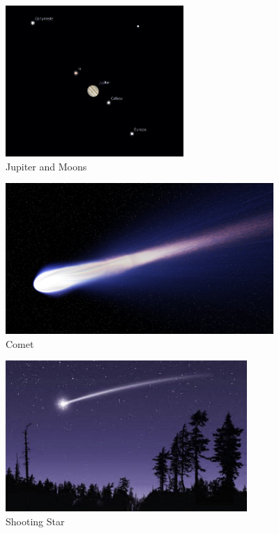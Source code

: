 \documentclass[letterpaper,twoside,12pt]{article}
\begin{document}
\begin{figure}[hbpt]\begin{centering}%
\includegraphics[height=2.25in]{Jupiter-and-moons-58b82f8c3df78c060e64eb8b.jpg}
\caption{Jupiter and Moons}
\label{fig:jupiterandmoons}
\end{centering}\end{figure}
\clearpage
\begin{figure}[hbpt]\begin{centering}%
\includegraphics[height=2.25in]{comet.jpg}
\caption{Comet}
\label{fig:comet}
\end{centering}\end{figure}
\begin{figure}[hbpt]\begin{centering}%
\includegraphics[height=2.25in]{shooting-star-1756306537.jpg}
\caption{Shooting Star}
\label{fig:shootingstar}
\end{centering}\end{figure}
\end{document}
